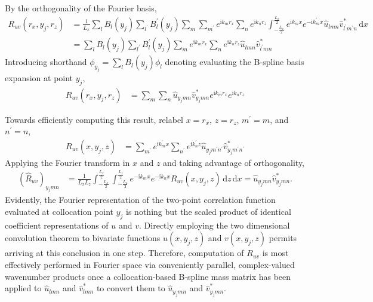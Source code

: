 \documentclass[letterpaper,11pt,nointlimits,reqno]{amsart}
\newcommand{\ii}{\ensuremath{\mathrm{i}}}
\begin{document}
By the orthogonality of the Fourier basis,
\begin{align}
R_{uv} \left( r_x, y_j, r_z \right)
  &= \frac{1}{L_x}
     \sum_{l} B_l\left(y_j\right)
     \sum_{l^\prime} B_l^\prime\left(y_j\right)
     \sum_{m}
     \sum_{m^\prime}
     e^{\ii k_m r_x}
     \sum_{n}
     e^{\ii k_n r_z}
     \int_{-\frac{L_x}{2}}^{\frac{L_x}{2}}
     e^{\ii k_m x  }
     e^{-\ii k_m^\prime x}
     \hat{u}_{l m n}
     \hat{v}^\ast_{l^\prime m^\prime n}
     \,\mathrm{d}x
\\
  &= \sum_{l} B_l\left(y_j\right)
     \sum_{l^\prime} B_l^\prime\left(y_j\right)
     \sum_{m}
     e^{\ii k_m r_x}
     \sum_{n}
     e^{\ii k_n r_z}
     \hat{u}_{l m n}
     \hat{v}^\ast_{l^\prime m n}
\end{align}
Introducing shorthand $\phi_{y_j} = \sum_{l} B_l\left(y_j\right) \phi_l$
denoting evaluating the B-spline basis expansion at point $y_j$,
\begin{align}
R_{uv} \left( r_x, y_j, r_z \right)
  &=
     \sum_{m}
     \sum_{n}
     \hat{u}_{y_j m n}
     \hat{v}^\ast_{y_j m n}
     e^{\ii k_m r_x}
     e^{\ii k_n r_z}
  \label{eq:twopoint_physical_xz}
\end{align}

Towards efficiently computing this result, relabel $x = r_x$, $z = r_z$,
$m^\prime = m$, and $n^\prime = n$,
\begin{align}
R_{uv} \left( x, y_j, z \right)
  &=
     \sum_{m^\prime}
     e^{\ii k_m^\prime x}
     \sum_{n^\prime}
     e^{\ii k_n^\prime z}
     \hat{u}_{y_j m^\prime n^\prime}
     \hat{v}^\ast_{y_j m^\prime n^\prime}
\end{align}
Applying the Fourier transform in $x$ and $z$ and taking advantage of
orthogonality,
\begin{align}
     \left(\hat{R}_{uv}\right)_{y_j m n}
  &=
     \frac{1}{L_x L_z}
     \int_{-\frac{L_x}{2}}^{\frac{L_x}{2}}
     \int_{-\frac{L_z}{2}}^{\frac{L_z}{2}}
     e^{-\ii k_m x}
     e^{-\ii k_n x}
     R_{uv} \left( x, y_j, z \right)
     \,\mathrm{d}z
     \,\mathrm{d}x
   =
     \hat{u}_{y_j m n} \hat{v}^\ast_{y_j m n}.
\end{align}
Evidently, the Fourier representation of the two-point correlation function
evaluated at collocation point $y_j$ is nothing but the scaled product of
identical coefficient representations of $u$ and $v$.  Directly employing the
two dimensional convolution theorem to bivariate functions $u(x, y_j, z)$ and
$v(x, y_j, z)$ permits arriving at this conclusion in one step.  Therefore,
computation of $R_{uv}$ is most effectively performed in Fourier space via
conveniently parallel, complex-valued wavenumber products once a
collocation-based B-spline mass matrix has been applied to $\hat{u}_{lmn}$ and
$\hat{v}^\ast_{lmn}$ to convert them to $\hat{u}_{y_j m n}$ and
$\hat{v}^\ast_{y_j m n}$.
\end{document}
